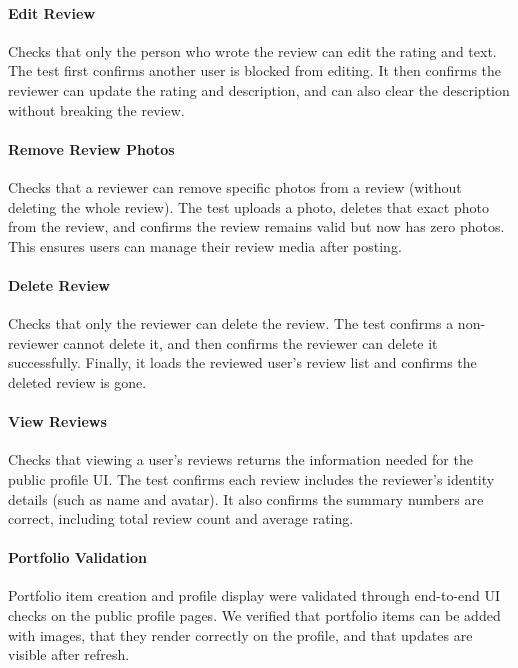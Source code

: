 \documentclass[11pt]{article}
\begin{document}
\paragraph{Edit Review}
Checks that only the person who wrote the review can edit the rating and text. The test first confirms another user is blocked from editing. It then confirms the reviewer can update the rating and description, and can also clear the description without breaking the review.

\paragraph{Remove Review Photos}
Checks that a reviewer can remove specific photos from a review (without deleting the whole review). The test uploads a photo, deletes that exact photo from the review, and confirms the review remains valid but now has zero photos. This ensures users can manage their review media after posting.

\paragraph{Delete Review}
Checks that only the reviewer can delete the review. The test confirms a non-reviewer cannot delete it, and then confirms the reviewer can delete it successfully. Finally, it loads the reviewed user's review list and confirms the deleted review is gone.

\paragraph{View Reviews}
Checks that viewing a user's reviews returns the information needed for the public profile UI. The test confirms each review includes the reviewer's identity details (such as name and avatar). It also confirms the summary numbers are correct, including total review count and average rating.

\paragraph{Portfolio Validation}
Portfolio item creation and profile display were validated through end-to-end UI checks on the public profile pages. We verified that portfolio items can be added with images, that they render correctly on the profile, and that updates are visible after refresh.

\end{document}
